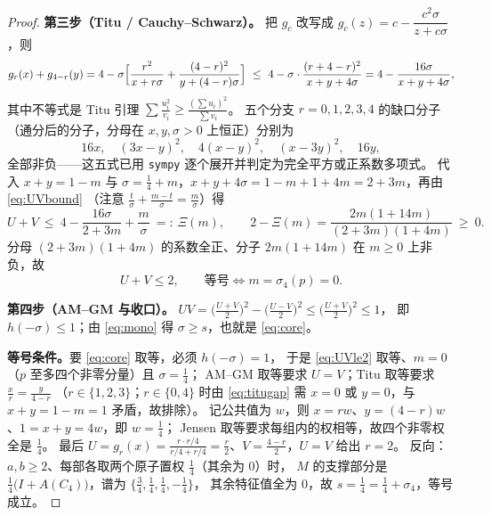 \documentclass[UTF8,11pt]{ctexart}
\theoremstyle{definition}
\begin{document}
\begin{proof}
\smallskip\noindent\textbf{第三步（Titu / Cauchy--Schwarz）。}
把 $g_c$ 改写成 $g_c(z)=c-\dfrac{c^2\sigma}{z+c\sigma}$，则
\[
g_r(x)+g_{4-r}(y)=4-\sigma\Bigl[\frac{r^2}{x+r\sigma}+\frac{(4-r)^2}{y+(4-r)\sigma}\Bigr]
\ \le\ 4-\sigma\cdot\frac{(r+4-r)^2}{x+y+4\sigma}=4-\frac{16\sigma}{x+y+4\sigma},
\]
其中不等式是 Titu 引理 $\sum\frac{u_i^2}{v_i}\ge\frac{(\sum u_i)^2}{\sum v_i}$。
五个分支 $r=0,1,2,3,4$ 的缺口分子（通分后的分子，分母在 $x,y,\sigma>0$ 上恒正）分别为
\begin{equation}\label{eq:titugap}
16x,\quad (3x-y)^2,\quad 4(x-y)^2,\quad (x-3y)^2,\quad 16y,
\end{equation}
全部非负——这五式已用 \texttt{sympy} 逐个展开并判定为完全平方或正系数多项式。
代入 $x+y=1-m$ 与 $\sigma=\frac14+m$，$x+y+4\sigma=1-m+1+4m=2+3m$，再由 \eqref{eq:UVbound}
（注意 $\frac t\sigma+\frac{m-t}{\sigma}=\frac m\sigma$）得
\begin{equation}\label{eq:UVsum}
U+V\ \le\ 4-\frac{16\sigma}{2+3m}+\frac{m}{\sigma}\ =:\ \Xi(m),
\qquad
2-\Xi(m)=\frac{2m(1+14m)}{(2+3m)(1+4m)}\ \ge\ 0 .
\end{equation}
分母 $(2+3m)(1+4m)$ 的系数全正、分子 $2m(1+14m)$ 在 $m\ge0$ 上非负，故
\begin{equation}\label{eq:UVle2}
U+V\le2,\qquad\text{等号}\iff m=\sigma_4(p)=0 .
\end{equation}

\smallskip\noindent\textbf{第四步（AM--GM 与收口）。}
$UV=\bigl(\frac{U+V}{2}\bigr)^2-\bigl(\frac{U-V}{2}\bigr)^2\le\bigl(\frac{U+V}{2}\bigr)^2\le1$，
即 $h(-\sigma)\le1$；由 \eqref{eq:mono} 得 $\sigma\ge s$，也就是 \eqref{eq:core}。

\smallskip\noindent\textbf{等号条件。}要 \eqref{eq:core} 取等，必须 $h(-\sigma)=1$，
于是 \eqref{eq:UVle2} 取等、$m=0$（$p$ 至多四个非零分量）且 $\sigma=\frac14$；
AM--GM 取等要求 $U=V$；Titu 取等要求 $\frac{x}{r}=\frac{y}{4-r}$
（$r\in\{1,2,3\}$；$r\in\{0,4\}$ 时由 \eqref{eq:titugap} 需 $x=0$ 或 $y=0$，与 $x+y=1-m=1$ 矛盾，故排除）。
记公共值为 $w$，则 $x=rw$、$y=(4-r)w$、$1=x+y=4w$，即 $w=\frac14$；
Jensen 取等要求每组内的权相等，故四个非零权全是 $\frac14$。
最后 $U=g_r(x)=\frac{r\cdot r/4}{r/4+r/4}=\frac r2$、$V=\frac{4-r}{2}$，$U=V$ 给出 $r=2$。
反向：$a,b\ge2$、每部各取两个原子置权 $\frac14$（其余为 $0$）时，
$M$ 的支撑部分是 $\frac14\bigl(I+A(C_4)\bigr)$，谱为 $\{\frac34,\frac14,\frac14,-\frac14\}$，
其余特征值全为 $0$，故 $s=\frac14=\frac14+\sigma_4$，等号成立。
\end{proof}
\end{document}
